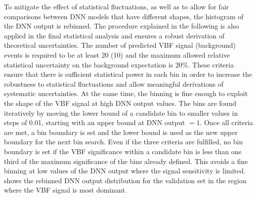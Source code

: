 To mitigate the effect of statistical fluctuations, as well as to allow for fair comparisons between DNN models that have different shapes, the histogram of the DNN output is rebinned. The procedure explained in the following is also applied in the final statistical analysis and ensures a robust derivation of theoretical uncertainties.
The number of predicted VBF signal (background) events is required to be at least 20 (10) and the maximum allowed relative statistical uncertainty on the background expectation is 20\%.
These criteria ensure that there is sufficient statistical power in each bin in order to increase the robustness to statistical fluctuations and allow meaningful derivations of systematic uncertainties. At the same time, the binning is fine enough to exploit the shape of the VBF signal at high DNN output values.
The bins are found iteratively by moving the lower bound of a candidate bin to smaller values in steps of 0.01, starting with an upper bound at DNN output $= 1$. Once all criteria are met, a bin boundary is set and the lower bound is used as the new upper boundary for the next bin search. Even if the three criteria are fulfilled, no bin boundary is set if the VBF significance within a candidate bin is less than one third of the maximum significance of the bins already defined. This avoids a fine binning at low values of the DNN output where the signal sensitivity is limited.
 shows the rebinned DNN output distribution for the validation set in the region where the VBF signal is most dominant.
